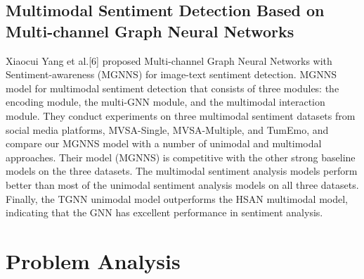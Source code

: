 \subsection{Multimodal Sentiment Detection Based on Multi-channel Graph Neural Networks}
Xiaocui Yang et al.[6] proposed Multi-channel Graph Neural Networks with Sentiment-awareness (MGNNS) for image-text sentiment detection. MGNNS model for multimodal sentiment detection that consists of three modules: the encoding module, the multi-GNN module, and the multimodal interaction module. They conduct experiments on three multimodal sentiment datasets from social media platforms, MVSA-Single, MVSA-Multiple, and TumEmo, and compare our MGNNS model with a number of unimodal and multimodal approaches. Their model (MGNNS) is competitive with the other strong baseline models on the three datasets. The multimodal sentiment analysis models perform better than most of the unimodal sentiment analysis models on all three datasets. Finally, the TGNN unimodal model outperforms the HSAN multimodal model, indicating that the GNN has excellent performance in sentiment analysis.

\section{Problem Analysis}






